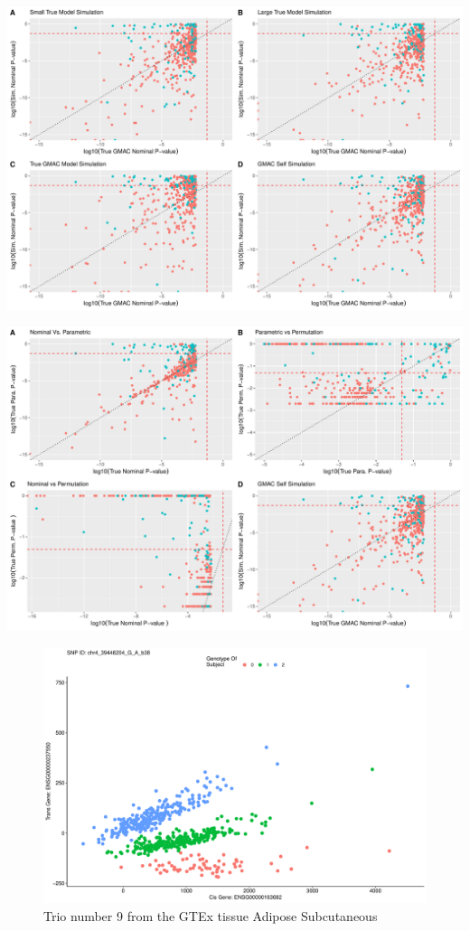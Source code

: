 \documentclass[
]{article}
\begin{document}
\includegraphics{5_17_2021_GMAC_plots_all_trios_files/figure-latex/unnamed-chunk-6-1.pdf}

\includegraphics{5_17_2021_GMAC_plots_all_trios_files/figure-latex/unnamed-chunk-7-1.pdf}

\begin{figure}
\centering
\includegraphics{5_17_2021_GMAC_plots_all_trios_files/figure-latex/unnamed-chunk-8-1.pdf}
\caption{Trio number 9 from the GTEx tissue Adipose Subcutaneous}
\end{figure}
\end{document}
